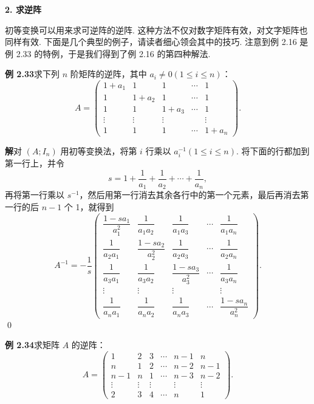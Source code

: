\documentclass[UTF8, 12pt, fontset=fandol, oneside]{ctexart}
\begin{document}
\noindent\textbf{2. 求逆阵}

初等变换可以用来求可逆阵的逆阵. 这种方法不仅对数字矩阵有效，对文字矩阵也同样有效. 下面是几个典型的例子，请读者细心领会其中的技巧. 注意到例 2.16 是例 2.33 的特例，于是我们得到了例 2.16 的第四种解法.

\noindent\textbf{例 2.33}\quad 求下列 $n$ 阶矩阵的逆阵，其中 $a_i\ne0(1\le i\le n)$：
\[
A=
\left(
\begin{array}{ccccc}
1+a_1 & 1 & 1 & \cdots & 1\\
1 & 1+a_2 & 1 & \cdots & 1\\
1 & 1 & 1+a_3 & \cdots & 1\\
\vdots & \vdots & \vdots & & \vdots\\
1 & 1 & 1 & \cdots & 1+a_n
\end{array}
\right).
\]

\noindent\textbf{解}\quad 对 $(A;I_n)$ 用初等变换法，将第 $i$ 行乘以 $a_i^{-1}(1\le i\le n)$. 将下面的行都加到第一行上，并令
\[
s=1+\frac1{a_1}+\frac1{a_2}+\cdots+\frac1{a_n},
\]
再将第一行乘以 $s^{-1}$，然后用第一行消去其余各行中的第一个元素，最后再消去第一行的后 $n-1$ 个 1，就得到
\[
A^{-1}=-\frac1s
\left(
\begin{array}{ccccc}
\dfrac{1-sa_1}{a_1^2} & \dfrac1{a_1a_2} & \dfrac1{a_1a_3} & \cdots & \dfrac1{a_1a_n}\\
\dfrac1{a_2a_1} & \dfrac{1-sa_2}{a_2^2} & \dfrac1{a_2a_3} & \cdots & \dfrac1{a_2a_n}\\
\dfrac1{a_3a_1} & \dfrac1{a_3a_2} & \dfrac{1-sa_3}{a_3^2} & \cdots & \dfrac1{a_3a_n}\\
\vdots & \vdots & \vdots & & \vdots\\
\dfrac1{a_na_1} & \dfrac1{a_na_2} & \dfrac1{a_na_3} & \cdots & \dfrac{1-sa_n}{a_n^2}
\end{array}
\right).
\]
\qed

\noindent\textbf{例 2.34}\quad 求矩阵 $A$ 的逆阵：
\[
A=
\left(
\begin{array}{cccccc}
1 & 2 & 3 & \cdots & n-1 & n\\
n & 1 & 2 & \cdots & n-2 & n-1\\
n-1 & n & 1 & \cdots & n-3 & n-2\\
\vdots & \vdots & \vdots & & \vdots & \vdots\\
2 & 3 & 4 & \cdots & n & 1
\end{array}
\right).
\]
\end{document}
